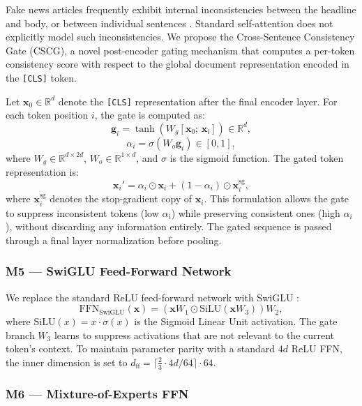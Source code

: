 \documentclass[conference]{IEEEtran}
\begin{document}
Fake news articles frequently exhibit internal inconsistencies between the headline and body, or between individual sentences \cite{popat2018declare}. Standard self-attention does not explicitly model such inconsistencies. We propose the Cross-Sentence Consistency Gate (CSCG), a novel post-encoder gating mechanism that computes a per-token consistency score with respect to the global document representation encoded in the \texttt{[CLS]} token.

Let $\mathbf{x}_0 \in \mathbb{R}^d$ denote the \texttt{[CLS]} representation after the final encoder layer. For each token position $i$, the gate is computed as:
\[
\mathbf{g}_i = \tanh\!\left(W_g [\mathbf{x}_0;\, \mathbf{x}_i]\right) \in \mathbb{R}^d,
\]
\[
\alpha_i = \sigma\!\left(W_o \mathbf{g}_i\right) \in [0,1],
\]
where $W_g \in \mathbb{R}^{d \times 2d}$, $W_o \in \mathbb{R}^{1 \times d}$, and $\sigma$ is the sigmoid function. The gated token representation is:
\[
\mathbf{x}_i' = \alpha_i \odot \mathbf{x}_i + (1 - \alpha_i) \odot \mathbf{x}_i^{\text{sg}},
\]
where $\mathbf{x}_i^{\text{sg}}$ denotes the stop-gradient copy of $\mathbf{x}_i$. This formulation allows the gate to suppress inconsistent tokens (low $\alpha_i$) while preserving consistent ones (high $\alpha_i$), without discarding any information entirely. The gated sequence is passed through a final layer normalization before pooling.

\subsubsection{M5 — SwiGLU Feed-Forward Network}

We replace the standard ReLU feed-forward network with SwiGLU \cite{shazeer2020glu}:
\[
\text{FFN}_{\text{SwiGLU}}(\mathbf{x}) = \left(\mathbf{x}W_1 \odot \text{SiLU}(\mathbf{x}W_3)\right)W_2,
\]
where $\text{SiLU}(x) = x \cdot \sigma(x)$ is the Sigmoid Linear Unit activation. The gate branch $W_3$ learns to suppress activations that are not relevant to the current token's context. To maintain parameter parity with a standard $4d$ ReLU FFN, the inner dimension is set to $d_{\text{ff}} = \lceil \frac{2}{3} \cdot 4d / 64 \rceil \cdot 64$.

\subsubsection{M6 — Mixture-of-Experts FFN}
\end{document}
